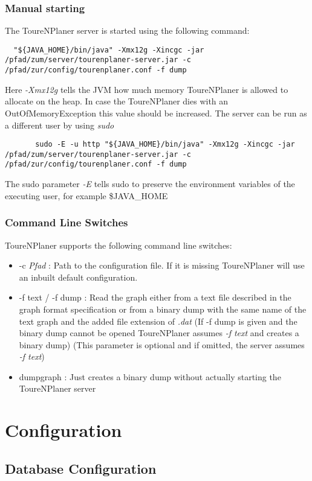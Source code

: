 \documentclass[ngerman,titlepage,parskip=true]{scrartcl}
\begin{document}
	\subsubsection{Manual starting}
  The ToureNPlaner server is started using the following command:
	\begin{lstlisting}
  "${JAVA_HOME}/bin/java" -Xmx12g -Xincgc -jar /pfad/zum/server/tourenplaner-server.jar -c /pfad/zur/config/tourenplaner.conf -f dump
	\end{lstlisting}
	Here \textit{-Xmx12g} tells the JVM how much memory ToureNPlaner is allowed to allocate on the heap. In case the ToureNPlaner dies with an OutOfMemoryException this value should be increased.
	The server can be run as a different user by using \textit{sudo}
	\begin{lstlisting}
	   sudo -E -u http "${JAVA_HOME}/bin/java" -Xmx12g -Xincgc -jar /pfad/zum/server/tourenplaner-server.jar -c /pfad/zur/config/tourenplaner.conf -f dump
	\end{lstlisting}
  The sudo parameter \textit{-E} tells sudo to preserve the environment variables of the executing user, for example \$JAVA\_HOME

	\subsubsection{Command Line Switches}
	ToureNPlaner supports the following command line switches:
	\begin{itemize}
	  \item -c \textit{Pfad} : Path to the configuration file. If it is missing ToureNPlaner will use an inbuilt default configuration.
	  \item -f text / -f dump : Read the graph either from a text file described in the graph format specification or from a binary dump with the same name of the text graph and the added file extension of \textit{.dat} (If -f dump is given and the binary dump cannot be opened ToureNPlaner assumes \textit{-f text} and creates a binary dump) (This parameter is optional and if omitted, the server assumes \textit{-f text})
	 \item dumpgraph : Just creates a binary dump without actually starting the ToureNPlaner server
	\end{itemize}

\section{Configuration}
\subsection{Database Configuration}
\end{document}
